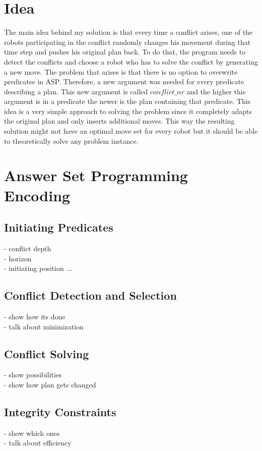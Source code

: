 \documentclass[runningheads]{llncs}
\begin{document}
\section{Idea}
The main idea behind my solution is that every time a conflict arises, one of the robots participating in the conflict randomly changes his movement during that time step and pushes his original plan back. 
To do that, the program needs to detect the conflicts and choose a robot who has to solve the conflict by generating a new move. The problem that arises is that
there is no option to overwrite predicates in ASP. Therefore, a new argument was needed for every predicate describing a plan. This new argument is called $conflict\_nr$ and 
the higher this argument is in a predicate the newer is the plan containing that predicate. This idea is a very simple approach to solving the problem since it completely adapts the original plan and only
inserts additional moves. This way the resulting solution might not have an optimal move set for every robot but it should be able to theoretically solve any problem instance.

\section{Answer Set Programming Encoding}
\subsection{Initiating Predicates}
- conflict depth \\
- horizon \\
- initiating position ... 

\subsection{Conflict Detection and Selection}
- show how its done \\
- talk about minimization \\


\subsection{Conflict Solving}
- show possibilities \\
- show how plan gets changed


\subsection{Integrity Constraints}
- show which ones \\
- talk about efficiency
\end{document}
